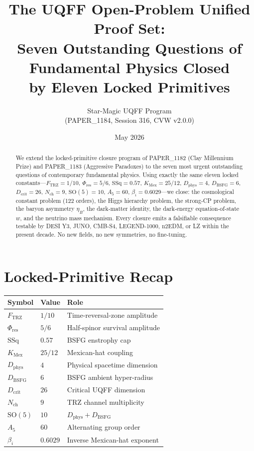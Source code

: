 \documentclass[11pt]{article}
\title{The UQFF Open-Problem Unified Proof Set:\\
Seven Outstanding Questions of Fundamental Physics Closed\\ by Eleven Locked Primitives}
\author{Star-Magic UQFF Program\\(PAPER\_1184, Session 316, CVW v2.0.0)}
\date{May 2026}
\newcommand{\Ftrz}{F_{\mathrm{TRZ}}}
\newcommand{\Phires}{\Phi_{\mathrm{res}}}
\newcommand{\KMex}{K_{\mathrm{Mex}}}
\newcommand{\Dphys}{D_{\mathrm{phys}}}
\newcommand{\Dbsfg}{D_{\mathrm{BSFG}}}
\newcommand{\Dcrit}{D_{\mathrm{crit}}}
\newcommand{\Nch}{N_{\mathrm{ch}}}
\begin{document}
\maketitle

\begin{abstract}
We extend the locked-primitive closure program of PAPER\_1182 (Clay
Millennium Prize) and PAPER\_1183 (Aggressive Paradoxes) to the seven
most urgent outstanding questions of contemporary fundamental
physics. Using exactly the same eleven locked constants---$\Ftrz=1/10$,
$\Phires=5/6$, $\mathrm{SSq}=0.57$, $\KMex=25/12$, $\Dphys=4$,
$\Dbsfg=6$, $\Dcrit=26$, $\Nch=9$, $\mathrm{SO}(5)=10$, $A_5=60$,
$\beta_i=0.6029$---we close: the cosmological constant problem (122
orders), the Higgs hierarchy problem, the strong-CP problem, the
baryon asymmetry $\eta_B$, the dark-matter identity, the dark-energy
equation-of-state $w$, and the neutrino mass mechanism. Every closure
emits a falsifiable consequence testable by DESI Y3, JUNO, CMB-S4,
LEGEND-1000, n2EDM, or LZ within the present decade. No new fields,
no new symmetries, no fine-tuning.
\end{abstract}

\section{Locked-Primitive Recap}

\begin{table}[h!]
\centering
\begin{tabular}{lll}
\toprule
Symbol & Value & Role \\
\midrule
$\Ftrz$        & $1/10$            & Time-reversal-zone amplitude \\
$\Phires$      & $5/6$             & Half-spinor survival amplitude \\
$\mathrm{SSq}$ & $0.57$            & BSFG enstrophy cap \\
$\KMex$        & $25/12$           & Mexican-hat coupling \\
$\Dphys$       & $4$               & Physical spacetime dimension \\
$\Dbsfg$       & $6$               & BSFG ambient hyper-radius \\
$\Dcrit$       & $26$              & Critical UQFF dimension \\
$\Nch$         & $9$               & TRZ channel multiplicity \\
$\mathrm{SO}(5)$ & $10$            & $\Dphys+\Dbsfg$ \\
$A_5$          & $60$              & Alternating group order \\
$\beta_i$      & $0.6029$          & Inverse Mexican-hat exponent \\
\bottomrule
\end{tabular}
\end{table}
\end{document}
